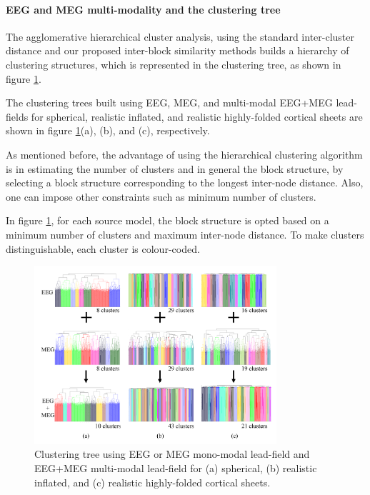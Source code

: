 \paragraph{EEG and MEG multi-modality and the clustering tree}
\label{EEG and MEG multimodality and the clustering tree} 
The agglomerative hierarchical cluster analysis, using the standard inter-cluster distance and our proposed inter-block similarity methods builds a hierarchy of clustering structures, which is represented in the clustering tree, as shown in figure \ref{fig:EMEG_Multimodality_Dendrogram}.

The clustering trees built using EEG, MEG, and multi-modal EEG+MEG lead-fields for spherical, realistic inflated, and realistic highly-folded cortical sheets are shown in figure \ref{fig:EMEG_Multimodality_Dendrogram}(a), (b), and (c), respectively. 

As mentioned before, the advantage of using the hierarchical clustering algorithm is in estimating the number of clusters and in general the block structure, by selecting a block structure corresponding to the longest inter-node distance.
Also, one can impose other constraints such as minimum number of clusters.

In figure \ref{fig:EMEG_Multimodality_Dendrogram}, for each source model, the block structure is opted based on a minimum number of clusters and maximum inter-node distance.
To make clusters distinguishable, each cluster is colour-coded.
\begin{figure}[!b]
\centering
\includegraphics[width=0.8\textwidth,keepaspectratio]{images/EMEG_Multimodality_Dendrogram.png} %
\centering
\caption{Clustering tree using EEG or MEG mono-modal lead-field and EEG+MEG multi-modal lead-field for (a) spherical, (b) realistic inflated, and (c) realistic highly-folded cortical sheets.}
\label{fig:EMEG_Multimodality_Dendrogram}
\end{figure}
\FloatBarrier
